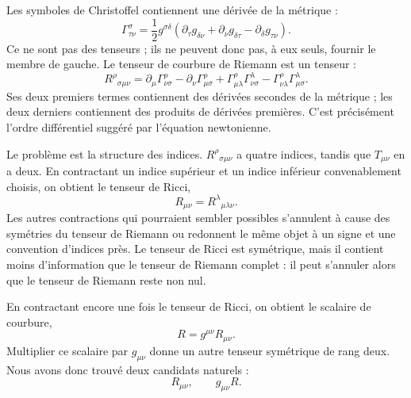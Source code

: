 Les symboles de Christoffel contiennent une dérivée de la métrique :
\begin{equation}
 \Gamma^\sigma_{\tau\nu}
 =
 \frac12 g^{\sigma\delta}
 \left(
 \partial_\tau g_{\delta\nu}
 +\partial_\nu g_{\delta\tau}
 -\partial_\delta g_{\tau\nu}
 \right).
 \label{eq:christoffel}
\end{equation}
Ce ne sont pas des tenseurs ; ils ne peuvent donc pas, à eux seuls, fournir le membre de gauche. Le tenseur de courbure de Riemann est un tenseur :
\begin{equation}
 R^\rho{}_{\sigma\mu\nu}
 =
 \partial_\mu\Gamma^\rho_{\nu\sigma}
 -\partial_\nu\Gamma^\rho_{\mu\sigma}
 +\Gamma^\rho_{\mu\lambda}\Gamma^\lambda_{\nu\sigma}
 -\Gamma^\rho_{\nu\lambda}\Gamma^\lambda_{\mu\sigma}.
 \label{eq:riemann}
\end{equation}
Ses deux premiers termes contiennent des dérivées secondes de la métrique ; les deux derniers contiennent des produits de dérivées premières. C’est précisément l’ordre différentiel suggéré par l’équation newtonienne.

Le problème est la structure des indices. \(R^\rho{}_{\sigma\mu\nu}\) a quatre indices, tandis que \(T_{\mu\nu}\) en a deux. En contractant un indice supérieur et un indice inférieur convenablement choisis, on obtient le tenseur de Ricci,
\begin{equation}
 R_{\mu\nu}=R^\lambda{}_{\mu\lambda\nu}.
 \label{eq:ricci}
\end{equation}
Les autres contractions qui pourraient sembler possibles s’annulent à cause des symétries du tenseur de Riemann ou redonnent le même objet à un signe et une convention d’indices près. Le tenseur de Ricci est symétrique, mais il contient moins d’information que le tenseur de Riemann complet : il peut s’annuler alors que le tenseur de Riemann reste non nul.

\begin{classroomqa}
\end{classroomqa}

En contractant encore une fois le tenseur de Ricci, on obtient le scalaire de courbure,
\begin{equation}
 R=g^{\mu\nu}R_{\mu\nu}.
 \label{eq:ricci-scalar}
\end{equation}
Multiplier ce scalaire par \(g_{\mu\nu}\) donne un autre tenseur symétrique de rang deux. Nous avons donc trouvé deux candidats naturels :
\begin{equation}
 R_{\mu\nu},
 \qquad
 g_{\mu\nu}R.
\end{equation}

